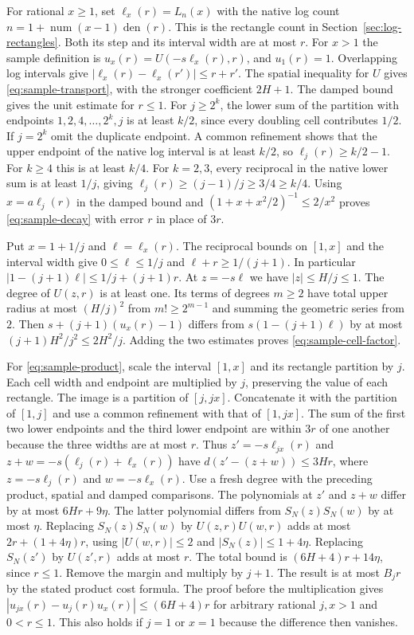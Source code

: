\documentclass[11pt]{amsart}
\theoremstyle{definition}
\theoremstyle{remark}
\numberwithin{equation}{section}
\begin{document}
For rational $x\ge1$, set $\ell_x(r)=L_n(x)$ with the
native log count $n=1+\operatorname{num}(x-1)\operatorname{den}(r)$.
This is the rectangle count in Section~\ref{sec:log-rectangles}.
Both its step and its interval width are at most $r$. For $x>1$ the sample
definition is $u_x(r)=U(-s\ell_x(r),r)$, and $u_1(r)=1$.
Overlapping log intervals give
$|\ell_x(r)-\ell_x(r')|\le r+r'$. The spatial inequality
for $U$ gives \eqref{eq:sample-transport}, with the
stronger coefficient $2H+1$. The damped bound gives the
unit estimate for $r\le1$. For $j\ge2^k$, the lower sum of
the partition with endpoints $1,2,4,\ldots,2^k,j$ is at
least $k/2$, since every doubling cell contributes $1/2$.
If $j=2^k$ omit the duplicate endpoint. A common refinement
shows that the upper endpoint of the native log interval
is at least $k/2$, so $\ell_j(r)\ge k/2-1$.
For $k\ge4$ this is at least $k/4$. For $k=2,3$,
every reciprocal in the native lower sum is at least
$1/j$, giving $\ell_j(r)\ge(j-1)/j\ge3/4\ge k/4$.
Using $x=a\ell_j(r)$ in the damped bound and
$(1+x+x^2/2)^{-1}\le2/x^2$ proves
\eqref{eq:sample-decay} with error $r$ in place of $3r$.

Put $x=1+1/j$ and $\ell=\ell_x(r)$. The reciprocal bounds
on $[1,x]$ and the interval width give
$0\le\ell\le1/j$ and $\ell+r\ge 1/(j+1)$.
In particular $|1-(j+1)\ell|\le1/j+(j+1)r$.
At $z=-s\ell$ we have $|z|\le H/j\le1$.
The degree of $U(z,r)$ is at least one. Its terms of degrees
$m\ge2$ have total upper radius at most $(H/j)^2$ from
$m!\ge2^{m-1}$ and summing the geometric series from $2$.
Then $s+(j+1)(u_x(r)-1)$ differs from
$s(1-(j+1)\ell)$ by at most $(j+1)H^2/j^2\le2H^2/j$.
Adding the two estimates proves \eqref{eq:sample-cell-factor}.

For \eqref{eq:sample-product}, scale the interval $[1,x]$
and its rectangle partition by $j$. Each cell width and
endpoint are multiplied by $j$, preserving the value of each
rectangle. The image is a partition of $[j,jx]$.
Concatenate it with the partition of $[1,j]$ and use a common
refinement with that of $[1,jx]$. The sum of the first
two lower endpoints and the third lower endpoint are
within $3r$ of one another because the three widths are
at most $r$. Thus $z'=-s\ell_{jx}(r)$ and
$z+w=-s(\ell_j(r)+\ell_x(r))$ have $d(z'-(z+w))\le3Hr$,
where $z=-s\ell_j(r)$ and $w=-s\ell_x(r)$.
Use a fresh degree with the preceding product, spatial
and damped comparisons. The polynomials at $z'$ and
$z+w$ differ by at most $6Hr+9\eta$. The latter polynomial
differs from $S_N(z)S_N(w)$ by at most $\eta$.
Replacing $S_N(z)S_N(w)$ by $U(z,r)U(w,r)$ adds at most
$2r+(1+4\eta)r$, using $|U(w,r)|\le2$ and
$|S_N(z)|\le1+4\eta$. Replacing $S_N(z')$ by $U(z',r)$
adds at most $r$. The total bound is
$(6H+4)r+14\eta$, since $r\le1$.
Remove the margin and multiply by $j+1$. The result is
at most $B_j r$ by the stated product cost formula.
The proof before the multiplication gives
$|u_{jx}(r)-u_j(r)u_x(r)|\le(6H+4)r$ for arbitrary rational
$j,x>1$ and $0<r\le1$. This also holds if $j=1$ or $x=1$
because the difference then vanishes.
\end{document}
